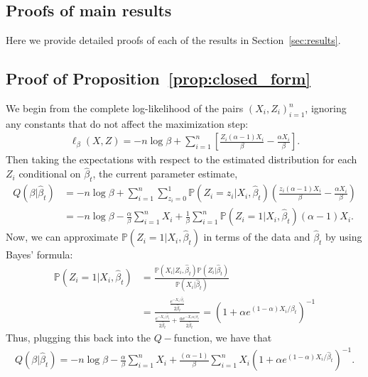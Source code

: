 \documentclass[runningheads]{llncs}
\begin{document}
\begin{subappendices}
  \renewcommand{\thesection}{\Alph{section}}%
  \section{Proofs of main results}
  \label{app:main_proofs}
  Here we provide detailed proofs of each of the results in Section~\ref{sec:results}.
  \subsection*{Proof of Proposition~\ref{prop:closed_form}}
We begin from the complete log-likelihood of the pairs $(X_i,Z_i)_{i=1}^n$,
ignoring any constants that do not affect the maximization step:
\begin{align*}
\ell_{\beta}(X,Z)
  = -n\log \beta +
  \sum_{i=1}^n \left[ \frac{Z_i(\alpha-1) X_i}{\beta} - \frac{\alpha X_i}{\beta}\right] .
\end{align*}
Then taking the expectations with respect to the estimated distribution for each
$Z_i$ conditional on $\hat{\beta}_t$, the current parameter estimate,
\begin{align*}
  Q(\beta|\hat{\beta}_t)
  &= -n\log\beta +
    \sum_{i=1}^n \sum_{z_i=0}^1 \mathbb{P}(Z_i=z_i|X_i, \hat{\beta}_t)\left(
\frac{z_i(\alpha-1) X_i}{\beta} - \frac{\alpha X_i}{\beta}\right) \\
  &= -n\log\beta - \frac{\alpha}{\beta}\sum_{i=1}^n X_i + \frac{1}{\beta}\sum_{i=1}^n \mathbb{P}(Z_i = 1|X_i, \hat{\beta}_t)(\alpha-1) X_i.
\end{align*}
Now, we can approximate $\mathbb{P}(Z_i = 1|X_i, \hat{\beta}_t)$ in terms of the
data and $\hat{\beta}_t$ by using Bayes' formula:
\begin{align*}
    \mathbb{P}(Z_i=1|X_i, \hat{\beta}_t)
  &= \frac{\mathbb{P}(X_i|Z_i, \hat{\beta}_t)\mathbb{P}(Z_i|\hat{\beta}_t)}
  {\mathbb{P}(X_i|\hat{\beta}_t)}
  \\
  &
  = \frac{\frac{e^{-X_i/\hat{\beta}_t}}{2\hat{\beta}_t}}
  {\frac{e^{-X_i/\hat{\beta}_t}}{2\hat{\beta}_t} + \frac{\alpha e^{-X_i \alpha / \hat{\beta}_t}}
  {2\hat{\beta}_t}}
  = (1+ \alpha e^{(1-\alpha) X_i /\hat{\beta}_t})^{-1}
\end{align*}
Thus, plugging this back into the $Q-$function, we have that
\begin{align*}
Q(\beta|\hat{\beta}_t)
  = -n\log\beta
  - \frac{\alpha}{\beta} \sum_{i=1}^n X_i
  + \frac{(\alpha - 1)}{\beta}
  \sum_{i=1}^n X_i(1+ \alpha e^{(1-\alpha) X_i /\hat{\beta}_t})^{-1}.

\end{align*}
\end{subappendices}
\end{document}
